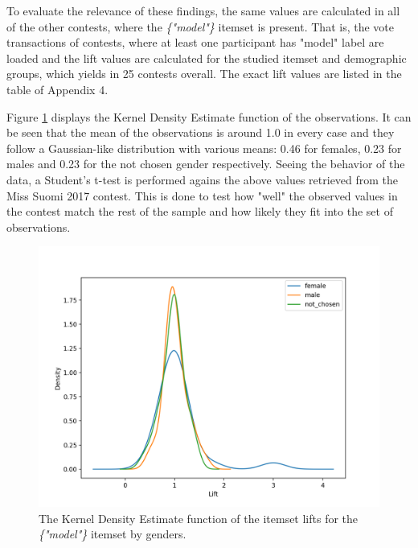 To evaluate the relevance of these findings, the same values are calculated in all of the other contests, where the \emph{\{"model"\}} itemset is present. That is, the vote transactions of contests, where at least one participant has "model" label are loaded and the lift values are calculated for the studied itemset and demographic groups, which yields in 25 contests overall. The exact lift values are listed in the table of Appendix 4. 

Figure \ref{model_itemset_lift_distribution} displays the Kernel Density Estimate function of the observations. It can be seen that the mean of the observations is around 1.0 in every case and they follow a Gaussian-like distribution with various means: 0.46 for females, 0.23 for males and 0.23 for the not chosen gender respectively. Seeing the behavior of the data, a Student's t-test is performed agains the above values retrieved from the Miss Suomi 2017 contest. This is done to test how "well" the observed values in the contest match the rest of the sample and how likely they fit into the set of observations.

\begin{figure}[H] 
    \begin{center}
        \includegraphics[width=1\textwidth,center]{Images/model_itemset_kde.png}
        \caption{The Kernel Density Estimate function of the itemset lifts for the \emph{\{"model"\}} itemset by genders.}
        \label{model_itemset_lift_distribution}
    \end{center}
\end{figure}

